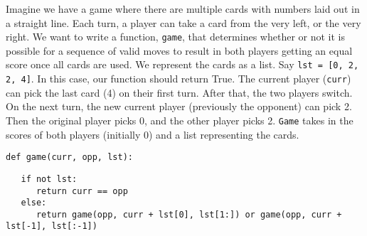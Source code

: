 \begin{blocksection}
\question Imagine we have a game where there are multiple cards with numbers laid out in a straight line. 
Each turn, a player can take a card from the very left, or the very right. 
\newline
We want to write a function, \texttt{game}, that determines whether or not it is possible for a sequence of valid 
moves to result in both players getting an equal score once all cards are used.
\newline
We represent the cards as a list. Say \texttt{lst = [0, 2, 2, 4]}. In this case, our function should return True. 
The current player (\texttt{curr}) can pick the last card (4) on their first turn. After that, the two players switch. 
On the next turn, the new current player (previously the opponent) can pick 2. Then the original player picks 0, 
and the other player picks 2.
\newline
\texttt{Game} takes in the scores of both players (initially 0) and a list representing the cards.
\newline
\begin{lstlisting}
def game(curr, opp, lst):
\end{lstlisting}
\begin{solution}
\begin{lstlisting}
   if not lst:
      return curr == opp
   else:
      return game(opp, curr + lst[0], lst[1:]) or game(opp, curr + lst[-1], lst[:-1])
\end{lstlisting}
\end{solution}
\end{blocksection}